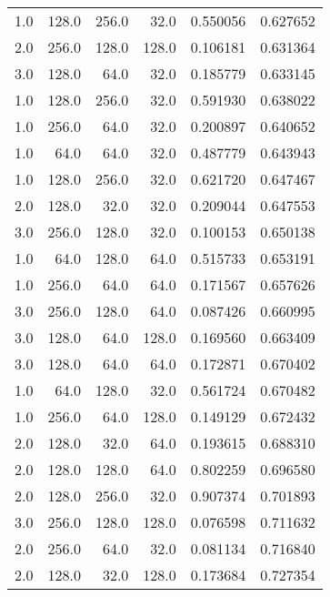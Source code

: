 \begin{longtable}{rrrrrr}
        1.0 &     128.0 &       256.0 &     32.0 &      0.550056 &    0.627652 \\
        2.0 &     256.0 &       128.0 &    128.0 &      0.106181 &    0.631364 \\
        3.0 &     128.0 &        64.0 &     32.0 &      0.185779 &    0.633145 \\
        1.0 &     128.0 &       256.0 &     32.0 &      0.591930 &    0.638022 \\
        1.0 &     256.0 &        64.0 &     32.0 &      0.200897 &    0.640652 \\
        1.0 &      64.0 &        64.0 &     32.0 &      0.487779 &    0.643943 \\
        1.0 &     128.0 &       256.0 &     32.0 &      0.621720 &    0.647467 \\
        2.0 &     128.0 &        32.0 &     32.0 &      0.209044 &    0.647553 \\
        3.0 &     256.0 &       128.0 &     32.0 &      0.100153 &    0.650138 \\
        1.0 &      64.0 &       128.0 &     64.0 &      0.515733 &    0.653191 \\
        1.0 &     256.0 &        64.0 &     64.0 &      0.171567 &    0.657626 \\
        3.0 &     256.0 &       128.0 &     64.0 &      0.087426 &    0.660995 \\
        3.0 &     128.0 &        64.0 &    128.0 &      0.169560 &    0.663409 \\
        3.0 &     128.0 &        64.0 &     64.0 &      0.172871 &    0.670402 \\
        1.0 &      64.0 &       128.0 &     32.0 &      0.561724 &    0.670482 \\
        1.0 &     256.0 &        64.0 &    128.0 &      0.149129 &    0.672432 \\
        2.0 &     128.0 &        32.0 &     64.0 &      0.193615 &    0.688310 \\
        2.0 &     128.0 &       128.0 &     64.0 &      0.802259 &    0.696580 \\
        2.0 &     128.0 &       256.0 &     32.0 &      0.907374 &    0.701893 \\
        3.0 &     256.0 &       128.0 &    128.0 &      0.076598 &    0.711632 \\
        2.0 &     256.0 &        64.0 &     32.0 &      0.081134 &    0.716840 \\
        2.0 &     128.0 &        32.0 &    128.0 &      0.173684 &    0.727354 \\

\end{longtable}
